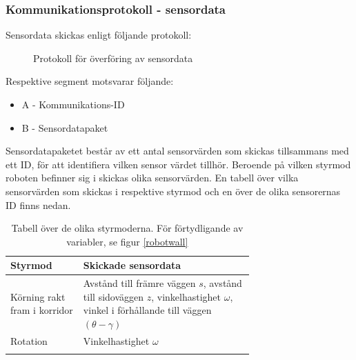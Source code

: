\documentclass[11pt]{article}
\begin{document}
\begin{flushleft}
\subsubsection{Kommunikationsprotokoll - sensordata}
Sensordata skickas enligt följande protokoll:

 \begin{figure}[H]
\centering
\noindent\resizebox{.8\linewidth}{!}{
	}
	\caption{Protokoll för överföring av sensordata\label{sensordata}}	
\end{figure} 

Respektive segment motsvarar följande: 
\begin{itemize}
	\item A - Kommunikations-ID
	\item B - Sensordatapaket
\end{itemize}

Sensordatapaketet består av ett antal sensorvärden som skickas tillsammans med ett ID, för att identifiera vilken sensor värdet tillhör. Beroende på vilken styrmod roboten befinner sig i skickas olika sensorvärden. En tabell över vilka sensorvärden som skickas i respektive styrmod och en över de olika sensorernas ID finns nedan.

\begin{longtable}[l]{| l | p{0.7\linewidth} |} \hline
\textbf{Styrmod} & \textbf{Skickade sensordata} \\ \hline 
Körning rakt fram i korridor & Avstånd till främre väggen $s$, avstånd till sidoväggen $z$, vinkelhastighet $\omega$, vinkel i förhållande till väggen $(\theta-\gamma)$ \\ \hline
Rotation & Vinkelhastighet $\omega$ \\ \hline
\caption{Tabell över de olika styrmoderna. För förtydligande av variabler, se figur \ref{robotwall}}
\end{longtable}



\end{flushleft}
\end{document}
